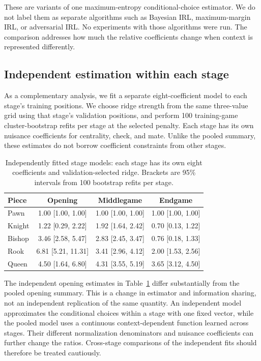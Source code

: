 \documentclass{jcst}
\begin{document}
These are variants of one maximum-entropy conditional-choice estimator. We do not label them as separate algorithms such as Bayesian IRL, maximum-margin IRL, or adversarial IRL. No experiments with those algorithms were run. The comparison addresses how much the relative coefficients change when context is represented differently.

\subsection{Independent estimation within each stage}
As a complementary analysis, we fit a separate eight-coefficient model to each stage's training positions. We choose ridge strength from the same three-value grid using that stage's validation positions, and perform 100 training-game cluster-bootstrap refits per stage at the selected penalty. Each stage has its own nuisance coefficients for centrality, check, and mate. Unlike the pooled summary, these estimates do not borrow coefficient constraints from other stages.
\begin{table}[t]\centering
\small
\caption{Independently fitted stage models: each stage has its own eight coefficients and validation-selected ridge. Brackets are 95\% intervals from 100 bootstrap refits per stage.}\label{tab:independent}
\begin{tabular}{lccc}
\toprule
Piece & Opening & Middlegame & Endgame\\\midrule
Pawn & 1.00 [1.00, 1.00] & 1.00 [1.00, 1.00] & 1.00 [1.00, 1.00]\\
Knight & 1.22 [0.29, 2.22] & 1.92 [1.64, 2.42] & 0.70 [0.13, 1.22]\\
Bishop & 3.46 [2.58, 5.47] & 2.83 [2.45, 3.47] & 0.76 [0.18, 1.33]\\
Rook & 6.81 [5.21, 11.31] & 3.41 [2.96, 4.12] & 2.00 [1.53, 2.56]\\
Queen & 4.50 [1.64, 6.80] & 4.31 [3.55, 5.19] & 3.65 [3.12, 4.50]\\
\bottomrule\end{tabular}\end{table}

The independent opening estimates in Table~\ref{tab:independent} differ substantially from the pooled opening summary. This is a change in estimator and information sharing, not an independent replication of the same quantity. An independent model approximates the conditional choices within a stage with one fixed vector, while the pooled model uses a continuous context-dependent function learned across stages. Their different normalization denominators and nuisance coefficients can further change the ratios. Cross-stage comparisons of the independent fits should therefore be treated cautiously.
\end{document}
